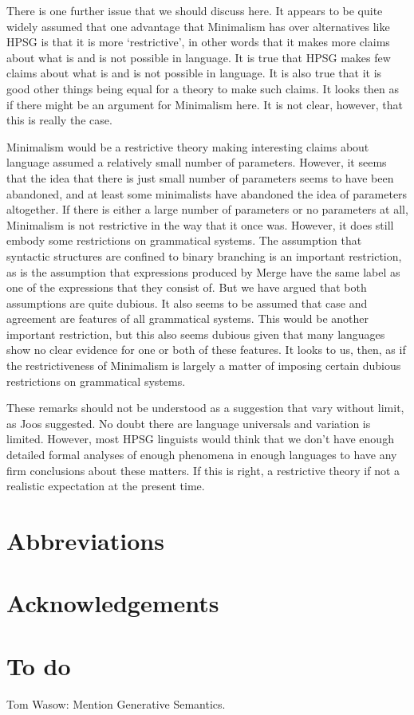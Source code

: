 \documentclass[output=paper]{langsci/langscibook}
\begin{document}
There is one further issue that we should discuss here. It appears to be quite widely assumed that
one advantage that Minimalism has over alternatives like HPSG is that it is more ‘restrictive’, in
other words that it makes more claims about what is and is not possible in language. It is true that
HPSG makes few claims about what is and is not possible in language. It is also true that it is good
other things being equal for a theory to make such claims. It looks then as if there might be an
argument for Minimalism here. It is not clear, however, that this is really the case.

Minimalism would be a restrictive theory making interesting claims about language assumed a
relatively small number of parameters. However, it seems that the idea that there is just small
number of parameters seems to have been abandoned, and at least some minimalists have abandoned the
idea of parameters altogether. If there is either a large number of parameters or no parameters at
all, Minimalism is not restrictive in the way that it once was. However, it does still embody some
restrictions on grammatical systems. The assumption that syntactic structures are confined to binary
branching is an important restriction, as is the assumption that expressions produced by Merge have
the same label as one of the expressions that they consist of. But we have argued that both
assumptions are quite dubious. It also seems to be assumed that case and agreement are features of
all grammatical systems. This would be another important restriction, but this also seems dubious
given that many languages show no clear evidence for one or both of these features. It looks to us,
then, as if the restrictiveness of Minimalism is largely a matter of imposing certain dubious
restrictions on grammatical systems.

These remarks should not be understood as a suggestion that vary without limit, as
Joos suggested. No doubt there are language universals and variation
is limited. However, most HPSG linguists would think that we don’t have enough detailed formal
analyses of enough phenomena in enough languages to have any firm conclusions about these matters.
If this is right, a restrictive theory if not a realistic expectation at the present time.




\section*{Abbreviations}
\section*{Acknowledgements}

\section{To do}


Tom Wasow: Mention Generative Semantics.

\printbibliography[heading=subbibliography,notkeyword=this] 
\end{document}
